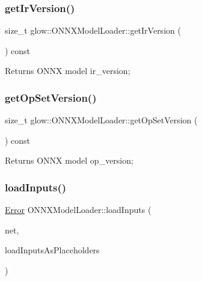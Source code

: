 \subsubsection{\texorpdfstring{get\+Ir\+Version()}{getIrVersion()}}
{\footnotesize\ttfamily size\+\_\+t glow\+::\+O\+N\+N\+X\+Model\+Loader\+::get\+Ir\+Version (\begin{DoxyParamCaption}{ }\end{DoxyParamCaption}) const\hspace{0.3cm}{\ttfamily [inline]}}

\begin{DoxyReturn}{Returns}
O\+N\+NX model ir\+\_\+version; 
\end{DoxyReturn}
\mbox{\label{classglow_1_1_o_n_n_x_model_loader_ad79bf9d6dce0929b7ac160370dde4016}} 
\subsubsection{\texorpdfstring{get\+Op\+Set\+Version()}{getOpSetVersion()}}
{\footnotesize\ttfamily size\+\_\+t glow\+::\+O\+N\+N\+X\+Model\+Loader\+::get\+Op\+Set\+Version (\begin{DoxyParamCaption}{ }\end{DoxyParamCaption}) const\hspace{0.3cm}{\ttfamily [inline]}}

\begin{DoxyReturn}{Returns}
O\+N\+NX model op\+\_\+version; 
\end{DoxyReturn}
\mbox{\label{classglow_1_1_o_n_n_x_model_loader_a058a0e98fd1cc21e4c092ddb4857969b}} 
\subsubsection{\texorpdfstring{load\+Inputs()}{loadInputs()}}
{\footnotesize\ttfamily \hyperlink{namespaceglow_afdb176c3a672ef66db0ecfc19a8d39bf}{Error} O\+N\+N\+X\+Model\+Loader\+::load\+Inputs (\begin{DoxyParamCaption}\item[{O\+N\+N\+X\+\_\+\+N\+A\+M\+E\+S\+P\+A\+C\+E\+::\+Graph\+Proto \&}]{net,  }\item[{bool}]{load\+Inputs\+As\+Placeholders }\end{DoxyParamCaption})\hspace{0.3cm}{\ttfamily [protected]}}

